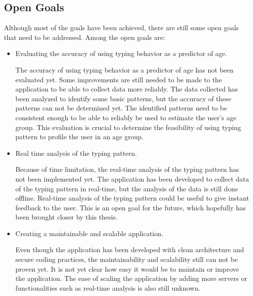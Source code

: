 \subsection{Open Goals}


Although most of the goals have been achieved, there are still some open goals that need to be addressed.
Among the open goals are:
\begin{itemize}
    \item Evaluating the accuracy of using typing behavior as a predictor of age.
    
    The accuracy of using typing behavior as a predictor of age has not been evaluated yet.
    Some improvements are still needed to be made to the application to be able to collect data more reliably.
    The data collected has been analyzed to identify some basic patterns, but the accuracy of these patterns can not be determined yet.
    The identified patterns need to be consistent enough to be able to reliably be used to estimate the user's age group.
    This evaluation is crucial to determine the feasibility of using typing pattern to profile the user in an age group.

    \item Real time analysis of the typing pattern.
    
    Because of time limitation, the real-time analysis of the typing pattern has not been implemented yet.
    The application has been developed to collect data of the typing pattern in real-time, but the analysis of the data is still done offline.
    Real-time analysis of the typing pattern could be useful to give instant feedback to the user.
    This is an open goal for the future, which hopefully has been brought closer by this thesis.

    \item Creating a maintainable and scalable application.
    
    Even though the application has been developed with clean architecture and secure coding practices, the maintainability and scalability still can not be proven yet.
    It is not yet clear how easy it would be to maintain or improve the application.
    The ease of scaling the application by adding more servers or functionalities such as real-time analysis is also still unknown.


\end{itemize}
